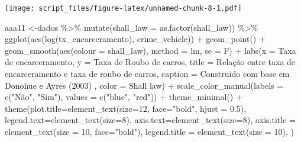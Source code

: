 \documentclass[
]{article}
\newenvironment{Shaded}{\begin{snugshade}}{\end{snugshade}}
\newcommand{\AttributeTok}[1]{\textcolor[rgb]{0.77,0.63,0.00}{#1}}
\newcommand{\DecValTok}[1]{\textcolor[rgb]{0.00,0.00,0.81}{#1}}
\newcommand{\FloatTok}[1]{\textcolor[rgb]{0.00,0.00,0.81}{#1}}
\newcommand{\FunctionTok}[1]{\textcolor[rgb]{0.00,0.00,0.00}{#1}}
\newcommand{\NormalTok}[1]{#1}
\newcommand{\OtherTok}[1]{\textcolor[rgb]{0.56,0.35,0.01}{#1}}
\newcommand{\SpecialCharTok}[1]{\textcolor[rgb]{0.00,0.00,0.00}{#1}}
\newcommand{\StringTok}[1]{\textcolor[rgb]{0.31,0.60,0.02}{#1}}
\begin{document}
\texttt{[image: script\_files/figure-latex/unnamed-chunk-8-1.pdf]}

\begin{Shaded}
\begin{Highlighting}[]
\NormalTok{aaa11 }\OtherTok{\textless{}{-}}\NormalTok{dados }\SpecialCharTok{\%\textgreater{}\%} 
  \FunctionTok{mutate}\NormalTok{(}\AttributeTok{shall\_law =} \FunctionTok{as.factor}\NormalTok{(shall\_law)) }\SpecialCharTok{\%\textgreater{}\%} 
  \FunctionTok{ggplot}\NormalTok{(}\FunctionTok{aes}\NormalTok{(}\FunctionTok{log}\NormalTok{(tx\_encarceramento), crime\_vehicle)) }\SpecialCharTok{+}
  \FunctionTok{geom\_point}\NormalTok{() }\SpecialCharTok{+} 
  \FunctionTok{geom\_smooth}\NormalTok{(}\FunctionTok{aes}\NormalTok{(}\AttributeTok{colour =}\NormalTok{ shall\_law), }\AttributeTok{method =} \StringTok{\textquotesingle{}lm\textquotesingle{}}\NormalTok{, }\AttributeTok{se =}\NormalTok{ F) }\SpecialCharTok{+}
  \FunctionTok{labs}\NormalTok{(}\AttributeTok{x =} \StringTok{\textquotesingle{}Taxa de encarceramento\textquotesingle{}}\NormalTok{,}
       \AttributeTok{y =} \StringTok{\textquotesingle{}Taxa de Roubo de carros\textquotesingle{}}\NormalTok{,}
       \AttributeTok{title =} \StringTok{\textquotesingle{}Relação entre taxa de encarceramento e taxa de roubo de carros\textquotesingle{}}\NormalTok{,}
       \AttributeTok{caption =} \StringTok{\textquotesingle{}Construido com base em Donohue e Ayres (2003)\textquotesingle{}}\NormalTok{ ,}
       \AttributeTok{color =} \StringTok{\textquotesingle{}Shall law\textquotesingle{}}\NormalTok{) }\SpecialCharTok{+} 
  \FunctionTok{scale\_color\_manual}\NormalTok{(}\AttributeTok{labels =} \FunctionTok{c}\NormalTok{(}\StringTok{"Não"}\NormalTok{, }\StringTok{"Sim"}\NormalTok{), }\AttributeTok{values =} \FunctionTok{c}\NormalTok{(}\StringTok{"blue"}\NormalTok{, }\StringTok{"red"}\NormalTok{)) }\SpecialCharTok{+} 
  \FunctionTok{theme\_minimal}\NormalTok{() }\SpecialCharTok{+}
  \FunctionTok{theme}\NormalTok{(}\AttributeTok{plot.title=}\FunctionTok{element\_text}\NormalTok{(}\AttributeTok{size=}\DecValTok{12}\NormalTok{, }\AttributeTok{face=}\StringTok{"bold"}\NormalTok{, }\AttributeTok{hjust =} \FloatTok{0.5}\NormalTok{),}
        \AttributeTok{legend.text=}\FunctionTok{element\_text}\NormalTok{(}\AttributeTok{size=}\DecValTok{8}\NormalTok{),}
        \AttributeTok{axis.text=}\FunctionTok{element\_text}\NormalTok{(}\AttributeTok{size=}\DecValTok{8}\NormalTok{),}
        \AttributeTok{axis.title =} \FunctionTok{element\_text}\NormalTok{(}\AttributeTok{size =} \DecValTok{10}\NormalTok{, }\AttributeTok{face=}\StringTok{"bold"}\NormalTok{),}
        \AttributeTok{legend.title =} \FunctionTok{element\_text}\NormalTok{(}\AttributeTok{size =} \DecValTok{10}\NormalTok{),}
\NormalTok{        )}



\end{Highlighting}
\end{Shaded}
\end{document}
